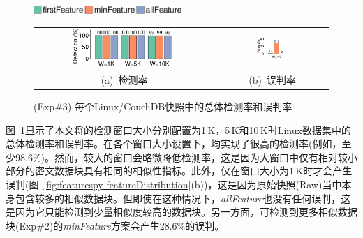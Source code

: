 \begin{figure}[!htb]
    \centering
    \includegraphics[width=0.5\textwidth]{pic/featurespy/plot/detection/overall/effectiveness-falsePositive_legend.pdf}
    \vspace{5pt}\\
    \begin{tabular}{@{\ }c@{\ }c}
        \includegraphics[width=0.6\textwidth]{pic/featurespy/plot/detection/overall/effectivenessLinux.pdf} &
        \includegraphics[width=0.3\textwidth]{pic/featurespy/plot/detection/overall/falsePositiveLinux.pdf}   \\
        \mbox{\small (a) 检测率}                                                                            &
        \mbox{\small (b) 误判率}                                                                              \\
    \end{tabular}
    \caption{(Exp\#3) 每个Linux/CouchDB快照中的总体检测率和误判率}
    \label{fig:featurespy-expDetectionOverallFalsePositive}
\end{figure}

图~\ref{fig:featurespy-expDetectionOverallFalsePositive}显示了本文将\sysnameF 的检测窗口大小分别配置为1\,K，5\,K和10\,K时Linux数据集中的总体检测率和误判率。在各个窗口大小设置下，\sysnameF 均实现了很高的检测率(例如，至少98.6\%)。然而，较大的窗口会略微降低检测率，这是因为大窗口中仅有相对较小部分的密文数据块具有相同的相似性指标。此外，\sysnameF 仅在窗口大小为1\,K时才会产生误判(图~\ref{fig:featurespy-featureDistribution}(b))，这是因为原始快照(Raw)当中本身包含较多的相似数据块。但即使在这种情况下，\textit{allFeature}也没有任何误判，这是因为它只能检测到少量相似度较高的数据块。另一方面，可检测到更多相似数据块(Exp\#2)的\textit{minFeature}方案会产生28.6\%的误判。

